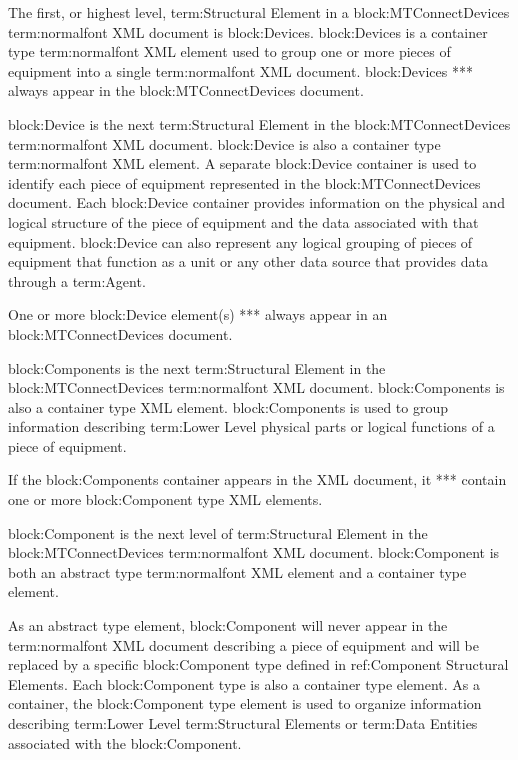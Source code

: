 The first, or highest level, {term:Structural Element} in a {block:MTConnectDevices} {term:normalfont XML} document is {block:Devices}. {block:Devices} is a container type {term:normalfont XML} element used to group one or more pieces of equipment into a single {term:normalfont XML} document.  {block:Devices} **\MUST** always appear in the {block:MTConnectDevices} document.

{block:Device} is the next {term:Structural Element} in the {block:MTConnectDevices} {term:normalfont XML} document. {block:Device} is also a container type {term:normalfont XML} element. A separate {block:Device} container is used to identify each piece of equipment represented in the {block:MTConnectDevices} document. Each {block:Device} container provides information on the physical and logical structure of the piece of equipment and the data associated with that equipment. {block:Device} can also represent any logical grouping of pieces of equipment that function as a unit or any other data source that provides data through a {term:Agent}.

One or more {block:Device} element(s) **\MUST** always appear in an {block:MTConnectDevices} document.

{block:Components} is the next {term:Structural Element} in the {block:MTConnectDevices} {term:normalfont XML} document. {block:Components} is also a container type XML element. {block:Components} is used to group information describing {term:Lower Level} physical parts or logical functions of a piece of equipment.

If the {block:Components} container appears in the XML document, it **\MUST** contain one or more {block:Component} type XML elements.

{block:Component} is the next level of {term:Structural Element} in the {block:MTConnectDevices} {term:normalfont XML} document. {block:Component} is both an abstract type {term:normalfont XML} element and a container type element. 

As an abstract type element, {block:Component} will never appear in the {term:normalfont XML} document describing a piece of equipment and will be replaced by a specific {block:Component} type defined in {ref:Component Structural Elements}. Each {block:Component} type is also a container type element. As a container, the {block:Component} type element is used to organize information describing {term:Lower Level} {term:Structural Elements} or {term:Data Entities} associated with the {block:Component}.

